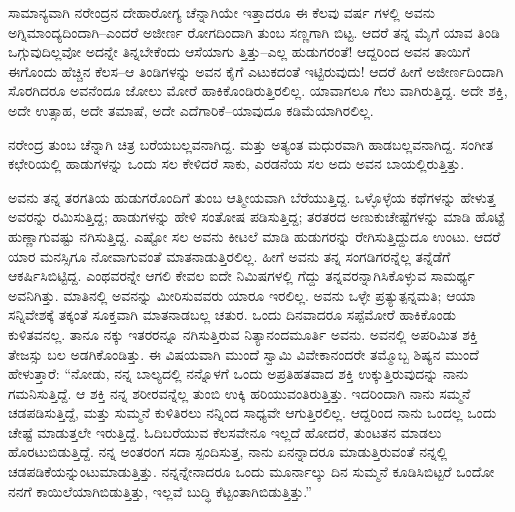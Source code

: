ಸಾಮಾನ್ಯವಾಗಿ ನರೇಂದ್ರನ ದೇಹಾರೋಗ್ಯ ಚೆನ್ನಾಗಿಯೇ ಇತ್ತಾದರೂ ಈ ಕೆಲವು ವರ್ಷ ಗಳಲ್ಲಿ ಅವನು ಅಗ್ನಿಮಾಂದ್ಯದಿಂದಾಗಿ–ಎಂದರೆ ಅಜೀರ್ಣ ರೋಗದಿಂದಾಗಿ ತುಂಬ ಸಣ್ಣಗಾಗಿ ಬಿಟ್ಟ. ಆದರೆ ತನ್ನ ಮೈಗೆ ಯಾವ ತಿಂಡಿ ಒಗ್ಗುವುದಿಲ್ಲವೋ ಅದನ್ನೇ ತಿನ್ನಬೇಕೆಂದು ಆಸೆಯಾಗು ತ್ತಿತ್ತು–ಎಲ್ಲ ಹುಡುಗರಂತೆ! ಆದ್ದರಿಂದ ಅವನ ತಾಯಿಗೆ ಈಗೊಂದು ಹೆಚ್ಚಿನ ಕೆಲಸ–ಆ ತಿಂಡಿಗಳನ್ನು ಅವನ ಕೈಗೆ ಎಟುಕದಂತೆ ಇಟ್ಟಿರುವುದು! ಆದರೆ ಹೀಗೆ ಅಜೀರ್ಣದಿಂದಾಗಿ ಸೊರಗಿದರೂ ಅವನೆಂದೂ ಜೋಲು ಮೋರೆ ಹಾಕಿಕೊಂಡಿರುತ್ತಿರಲಿಲ್ಲ. ಯಾವಾಗಲೂ ಗೆಲು ವಾಗಿರುತ್ತಿದ್ದ. ಅದೇ ಶಕ್ತಿ, ಅದೇ ಉತ್ಸಾಹ, ಅದೇ ತಮಾಷೆ, ಅದೇ ಎದೆಗಾರಿಕೆ–ಯಾವುದೂ ಕಡಿಮೆಯಾಗಿರಲಿಲ್ಲ.

ನರೇಂದ್ರ ತುಂಬ ಚೆನ್ನಾಗಿ ಚಿತ್ರ ಬರೆಯಬಲ್ಲವನಾಗಿದ್ದ. ಮತ್ತು ಅತ್ಯಂತ ಮಧುರವಾಗಿ ಹಾಡಬಲ್ಲವನಾಗಿದ್ದ. ಸಂಗೀತ ಕಛೇರಿಯಲ್ಲಿ ಹಾಡುಗಳನ್ನು ಒಂದು ಸಲ ಕೇಳಿದರೆ ಸಾಕು, ಎರಡನೆಯ ಸಲ ಅದು ಅವನ ಬಾಯಲ್ಲಿರುತ್ತಿತ್ತು.

ಅವನು ತನ್ನ ತರಗತಿಯ ಹುಡುಗರೊಂದಿಗೆ ತುಂಬ ಆತ್ಮೀಯವಾಗಿ ಬೆರೆಯುತ್ತಿದ್ದ. ಒಳ್ಳೊಳ್ಳೆಯ ಕಥೆಗಳನ್ನು ಹೇಳುತ್ತ ಅವರನ್ನು ರಮಿಸುತ್ತಿದ್ದ; ಹಾಡುಗಳನ್ನು ಹೇಳಿ ಸಂತೋಷ ಪಡಿಸುತ್ತಿದ್ದ; ತರತರದ ಅಣುಕುಚೇಷ್ಟೆಗಳನ್ನು ಮಾಡಿ ಹೊಟ್ಟೆ ಹುಣ್ಣಾಗುವಷ್ಟು ನಗಿಸುತ್ತಿದ್ದ. ಎಷ್ಟೋ ಸಲ ಅವನು ಕೀಟಲೆ ಮಾಡಿ ಹುಡುಗರನ್ನು ರೇಗಿಸುತ್ತಿದ್ದುದೂ ಉಂಟು. ಆದರೆ ಯಾರ ಮನಸ್ಸಿಗೂ ನೋವಾಗುವಂತೆ ಮಾತನಾಡುತ್ತಿರಲಿಲ್ಲ. ಹೀಗೆ ಅವನು ತನ್ನ ಸಂಗಡಿಗರನ್ನೆಲ್ಲ ತನ್ನೆಡೆಗೆ ಆಕರ್ಷಿಸಿಬಿಟ್ಟಿದ್ದ. ಎಂಥವರನ್ನೇ ಆಗಲಿ ಕೇವಲ ಐದೇ ನಿಮಿಷಗಳಲ್ಲಿ ಗೆದ್ದು ತನ್ನವರನ್ನಾಗಿಸಿಕೊಳ್ಳುವ ಸಾಮರ್ಥ್ಯ ಅವನಿಗಿತ್ತು. ಮಾತಿನಲ್ಲಿ ಅವನನ್ನು ಮೀರಿಸುವವರು ಯಾರೂ ಇರಲಿಲ್ಲ. ಅವನು ಒಳ್ಳೇ ಪ್ರತ್ಯುತ್ಪನ್ನಮತಿ; ಆಯಾ ಸನ್ನಿವೇಶಕ್ಕೆ ತಕ್ಕಂತೆ ಸೂಕ್ತವಾಗಿ ಮಾತನಾಡಬಲ್ಲ ಚತುರ. ಒಂದು ದಿನವಾದರೂ ಸಪ್ಪೆಮೋರೆ ಹಾಕಿಕೊಂಡು ಕುಳಿತವನಲ್ಲ. ತಾನೂ ನಕ್ಕು ಇತರರನ್ನೂ ನಗಿಸುತ್ತಿರುವ ನಿತ್ಯಾನಂದಮೂರ್ತಿ ಅವನು. ಅವನಲ್ಲಿ ಅಪರಿಮಿತ ಶಕ್ತಿ ತೇಜಸ್ಸು ಬಲ ಅಡಗಿಕೊಂಡಿತ್ತು. ಈ ವಿಷಯವಾಗಿ ಮುಂದೆ ಸ್ವಾಮಿ ವಿವೇಕಾನಂದರೇ ತಮ್ಮೊಬ್ಬ ಶಿಷ್ಯನ ಮುಂದೆ ಹೇಳುತ್ತಾರೆ: “ನೋಡು, ನನ್ನ ಬಾಲ್ಯದಲ್ಲಿ ನನ್ನೊಳಗೆ ಒಂದು ಅಪ್ರತಿಹತವಾದ ಶಕ್ತಿ ಉಕ್ಕುತ್ತಿರುವುದನ್ನು ನಾನು ಗಮನಿಸುತ್ತಿದ್ದೆ. ಆ ಶಕ್ತಿ ನನ್ನ ಶರೀರವನ್ನೆಲ್ಲ ತುಂಬಿ ಉಕ್ಕಿ ಹರಿಯುವಂತಿರುತ್ತಿತ್ತು. ಇದರಿಂದಾಗಿ ನಾನು ಸಮ್ಮನೆ ಚಡಪಡಿಸುತ್ತಿದ್ದೆ, ಮತ್ತು ಸುಮ್ಮನೆ ಕುಳಿತಿರಲು ನನ್ನಿಂದ ಸಾಧ್ಯವೇ ಆಗುತ್ತಿರಲಿಲ್ಲ. ಆದ್ದರಿಂದ ನಾನು ಒಂದಲ್ಲ ಒಂದು ಚೇಷ್ಟೆ ಮಾಡುತ್ತಲೇ ಇರುತ್ತಿದ್ದೆ. ಓದಿಬರೆಯುವ ಕೆಲಸವೇನೂ ಇಲ್ಲದೆ ಹೋದರೆ, ತುಂಟತನ ಮಾಡಲು ಹೊರಟುಬಿಡುತ್ತಿದ್ದೆ. ನನ್ನ ಅಂತರಂಗ ಸದಾ ಸ್ಪಂದಿಸುತ್ತ, ನಾನು ಏನನ್ನಾದರೂ ಮಾಡುತ್ತಿರುವಂತೆ ನನ್ನಲ್ಲಿ ಚಡಪಡಿಕೆಯನ್ನುಂಟುಮಾಡುತ್ತಿತ್ತು. ನನ್ನನ್ನೇನಾದರೂ ಒಂದು ಮೂರ್ನಾಲ್ಕು ದಿನ ಸುಮ್ಮನೆ ಕೂಡಿಸಿಬಿಟ್ಟರೆ ಒಂದೋ ನನಗೆ ಕಾಯಿಲೆಯಾಗಿಬಿಡುತ್ತಿತ್ತು, ಇಲ್ಲವೆ ಬುದ್ಧಿ ಕೆಟ್ಟಂತಾಗಿಬಿಡುತ್ತಿತ್ತು.”

